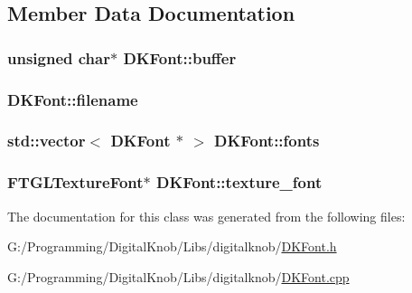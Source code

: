 \subsection{Member Data Documentation}
\hypertarget{class_d_k_font_afd3286763bda71d401e9fde6d07d51af}{
\subsubsection[{buffer}]{\setlength{\rightskip}{0pt plus 5cm}unsigned char$\ast$ D\-K\-Font\-::buffer}}\label{class_d_k_font_afd3286763bda71d401e9fde6d07d51af}
\hypertarget{class_d_k_font_ad93a32fc400f5ce91d7e65e8222c5665}{
\subsubsection[{filename}]{ D\-K\-Font\-::filename}}\label{class_d_k_font_ad93a32fc400f5ce91d7e65e8222c5665}
\hypertarget{class_d_k_font_a04e98f175cdb9b59782de93e4d3d4c18}{
\subsubsection[{fonts}]{\setlength{\rightskip}{0pt plus 5cm}std\-::vector$<$ {\bf D\-K\-Font} $\ast$ $>$ D\-K\-Font\-::fonts\hspace{0.3cm}{\ttfamily [static]}}}\label{class_d_k_font_a04e98f175cdb9b59782de93e4d3d4c18}
\hypertarget{class_d_k_font_a10afb3fd2e315f208a52190e1b907df6}{
\subsubsection[{texture\-\_\-font}]{\setlength{\rightskip}{0pt plus 5cm}F\-T\-G\-L\-Texture\-Font$\ast$ D\-K\-Font\-::texture\-\_\-font}}\label{class_d_k_font_a10afb3fd2e315f208a52190e1b907df6}


The documentation for this class was generated from the following files\-:\begin{DoxyCompactItemize}
\item 
G\-:/\-Programming/\-Digital\-Knob/\-Libs/digitalknob/\hyperlink{_d_k_font_8h}{D\-K\-Font.\-h}\item 
G\-:/\-Programming/\-Digital\-Knob/\-Libs/digitalknob/\hyperlink{_d_k_font_8cpp}{D\-K\-Font.\-cpp}\end{DoxyCompactItemize}
